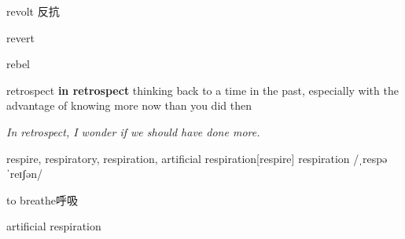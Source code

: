 \begin{word}{revolt}
    反抗
\end{word}

\begin{word}{revert}
\end{word}

\begin{word}{rebel}
\end{word}

\begin{word}{retrospect}
    \textbf{in retrospect} thinking back to a time in the past, especially with the advantage of knowing more now than you did then

    \textit{In retrospect, I wonder if we should have done more.}
\end{word}

\begin{word}{respire, respiratory, respiration, artificial respiration}[respire]
    respiration /ˌrespəˈreɪʃən/ 

    to breathe呼吸

    artificial respiration
\end{word}